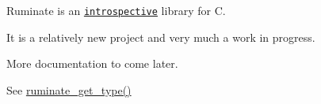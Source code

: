Ruminate is an \href{http://en.wikipedia.org/wiki/Introspection_(computer_science)}{\tt introspective} library for C.

It is a relatively new project and very much a work in progress.

More documentation to come later.

See \hyperlink{ruminate_2ruminate_8h_a1d17861ce087a20632d29f3b6e09dccb}{ruminate\-\_\-get\-\_\-type()} 